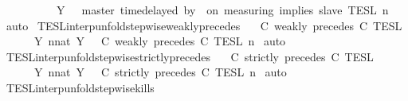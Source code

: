 \begin{isabellebody}
\ \ \ \ \ \ \ \ \ \ Y\ {\isacharequal}\ {\isasymlbrakk}\ master\ time{\isacharminus}delayed{\isasymbowtie}\ by\ {\isasymdelta}{\isasymtau}\ on\ measuring\ implies\ slave\ {\isasymrbrakk}\isactrlsub T\isactrlsub E\isactrlsub S\isactrlsub L\isactrlbsup {\isasymge}\ n\isactrlesup {\isacharbraceright}{\isacartoucheclose}\isanewline
%
\isadelimproof
%
\endisadelimproof
%
\isatagproof
{}\isamarkupfalse%
\ auto%
\endisatagproof
{\isafoldproof}%
%
\isadelimproof
\isanewline
%
\endisadelimproof
\isanewline
{}\isamarkupfalse%
\ TESL{\isacharunderscore}interp{\isacharunderscore}unfold{\isacharunderscore}stepwise{\isacharunderscore}weakly{\isacharunderscore}precedes{\isacharcolon}\isanewline
\ \ {\isacartoucheopen}{\isasymlbrakk}\ C\ weakly\ precedes\ C\ {\isasymrbrakk}\isactrlsub T\isactrlsub E\isactrlsub S\isactrlsub L\isanewline
\ \ \ \ {\isacharequal}\ {\isasymInter}\ {\isacharbraceleft}Y{\isachardot}\ {\isasymexists}n{\isacharcolon}{\isacharcolon}nat{\isachardot}\ Y\ {\isacharequal}\ {\isasymlbrakk}\ C\ weakly\ precedes\ C\ {\isasymrbrakk}\isactrlsub T\isactrlsub E\isactrlsub S\isactrlsub L\isactrlbsup {\isasymge}\ n\isactrlesup {\isacharbraceright}{\isacartoucheclose}\isanewline
%
\isadelimproof
%
\endisadelimproof
%
\isatagproof
{}\isamarkupfalse%
\ auto%
\endisatagproof
{\isafoldproof}%
%
\isadelimproof
\isanewline
%
\endisadelimproof
\isanewline
{}\isamarkupfalse%
\ TESL{\isacharunderscore}interp{\isacharunderscore}unfold{\isacharunderscore}stepwise{\isacharunderscore}strictly{\isacharunderscore}precedes{\isacharcolon}\isanewline
\ \ {\isacartoucheopen}{\isasymlbrakk}\ C\ strictly\ precedes\ C\ {\isasymrbrakk}\isactrlsub T\isactrlsub E\isactrlsub S\isactrlsub L\isanewline
\ \ \ \ {\isacharequal}\ {\isasymInter}\ {\isacharbraceleft}Y{\isachardot}\ {\isasymexists}n{\isacharcolon}{\isacharcolon}nat{\isachardot}\ Y\ {\isacharequal}\ {\isasymlbrakk}\ C\ strictly\ precedes\ C\ {\isasymrbrakk}\isactrlsub T\isactrlsub E\isactrlsub S\isactrlsub L\isactrlbsup {\isasymge}\ n\isactrlesup {\isacharbraceright}{\isacartoucheclose}\isanewline
%
\isadelimproof
%
\endisadelimproof
%
\isatagproof
{}\isamarkupfalse%
\ auto%
\endisatagproof
{\isafoldproof}%
%
\isadelimproof
\isanewline
%
\endisadelimproof
\isanewline
{}\isamarkupfalse%
\ TESL{\isacharunderscore}interp{\isacharunderscore}unfold{\isacharunderscore}stepwise{\isacharunderscore}kills{\isacharcolon}\isanewline

\end{isabellebody}
